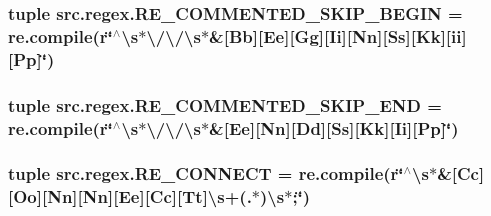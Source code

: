 \hypertarget{namespacesrc_1_1regex_aca6e6879b06e8f0dbc52b55d910387e5}{
\subsubsection[{R\-E\-\_\-\-C\-O\-M\-M\-E\-N\-T\-E\-D\-\_\-\-S\-K\-I\-P\-\_\-\-B\-E\-G\-I\-N}]{\setlength{\rightskip}{0pt plus 5cm}tuple src.\-regex.\-R\-E\-\_\-\-C\-O\-M\-M\-E\-N\-T\-E\-D\-\_\-\-S\-K\-I\-P\-\_\-\-B\-E\-G\-I\-N = re.\-compile(r\char`\"{}$^\wedge$\textbackslash{}s$\ast$\textbackslash{}/\textbackslash{}/\textbackslash{}s$\ast$\&\mbox{[}Bb\mbox{]}\mbox{[}Ee\mbox{]}\mbox{[}Gg\mbox{]}\mbox{[}Ii\mbox{]}\mbox{[}Nn\mbox{]}\mbox{[}Ss\mbox{]}\mbox{[}Kk\mbox{]}\mbox{[}ii\mbox{]}\mbox{[}Pp\mbox{]}\char`\"{})}}\label{namespacesrc_1_1regex_aca6e6879b06e8f0dbc52b55d910387e5}
\hypertarget{namespacesrc_1_1regex_a898b794f4f52ea429a53ce8cdd32731d}{
\subsubsection[{R\-E\-\_\-\-C\-O\-M\-M\-E\-N\-T\-E\-D\-\_\-\-S\-K\-I\-P\-\_\-\-E\-N\-D}]{\setlength{\rightskip}{0pt plus 5cm}tuple src.\-regex.\-R\-E\-\_\-\-C\-O\-M\-M\-E\-N\-T\-E\-D\-\_\-\-S\-K\-I\-P\-\_\-\-E\-N\-D = re.\-compile(r\char`\"{}$^\wedge$\textbackslash{}s$\ast$\textbackslash{}/\textbackslash{}/\textbackslash{}s$\ast$\&\mbox{[}Ee\mbox{]}\mbox{[}Nn\mbox{]}\mbox{[}Dd\mbox{]}\mbox{[}Ss\mbox{]}\mbox{[}Kk\mbox{]}\mbox{[}Ii\mbox{]}\mbox{[}Pp\mbox{]}\char`\"{})}}\label{namespacesrc_1_1regex_a898b794f4f52ea429a53ce8cdd32731d}
\hypertarget{namespacesrc_1_1regex_a61b3778ed726b2a6b5d5ac6e4341f8f5}{
\subsubsection[{R\-E\-\_\-\-C\-O\-N\-N\-E\-C\-T}]{\setlength{\rightskip}{0pt plus 5cm}tuple src.\-regex.\-R\-E\-\_\-\-C\-O\-N\-N\-E\-C\-T = re.\-compile(r\char`\"{}$^\wedge$\textbackslash{}s$\ast$\&\mbox{[}Cc\mbox{]}\mbox{[}Oo\mbox{]}\mbox{[}Nn\mbox{]}\mbox{[}Nn\mbox{]}\mbox{[}Ee\mbox{]}\mbox{[}Cc\mbox{]}\mbox{[}Tt\mbox{]}\textbackslash{}s+(.$\ast$)\textbackslash{}s$\ast$;\char`\"{})}}\label{namespacesrc_1_1regex_a61b3778ed726b2a6b5d5ac6e4341f8f5}
